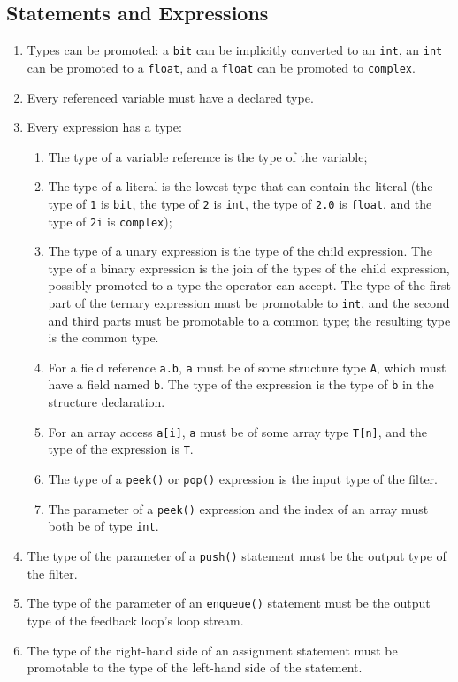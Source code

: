 \documentclass[11pt]{article}
\begin{document}
\subsection{Statements and Expressions}

\begin{enumerate}
\item Types can be promoted: a \lstinline|bit| can be implicitly
  converted to an \lstinline|int|, an \lstinline|int| can be promoted
  to a \lstinline|float|, and a \lstinline|float| can be promoted to
  \lstinline|complex|.
\item Every referenced variable must have a declared type.
\item Every expression has a type:
\begin{enumerate}
\item The type of a variable reference is the type of the variable;
\item The type of a literal is the lowest type that can contain the
  literal (the type of \lstinline|1| is \lstinline|bit|, the type of
  \lstinline|2| is \lstinline|int|, the type of \lstinline|2.0| is
  \lstinline|float|, and the type of \lstinline|2i| is
  \lstinline|complex|);
\item The type of a unary expression is the type of the child
  expression.  The type of a binary expression is the join of the
  types of the child expression, possibly promoted to a type the
  operator can accept.  The type of the first part of the ternary
  expression must be promotable to \lstinline|int|, and the second and
  third parts must be promotable to a common type; the resulting type
  is the common type.
\item For a field reference \lstinline|a.b|, \lstinline|a| must be of
  some structure type \lstinline|A|, which must have a field named
  \lstinline|b|.  The type of the expression is the type of
  \lstinline|b| in the structure declaration.
\item For an array access \lstinline|a[i]|, \lstinline|a| must be of
  some array type \lstinline|T[n]|, and the type of the expression is
  \lstinline|T|.
\item The type of a \lstinline|peek()| or \lstinline|pop()| expression
  is the input type of the filter.
\item The parameter of a \lstinline|peek()| expression and the index
  of an array must both be of type \lstinline|int|.
\end{enumerate}
\item The type of the parameter of a \lstinline|push()| statement must
  be the output type of the filter.
\item The type of the parameter of an \lstinline|enqueue()| statement
  must be the output type of the feedback loop's loop stream.
\item The type of the right-hand side of an assignment statement must
  be promotable to the type of the left-hand side of the statement.
\end{enumerate}
\end{document}
